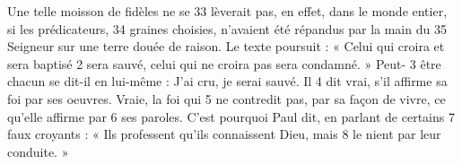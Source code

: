 Une telle moisson de fidèles ne se	 
33	 	lèverait pas, en effet, dans le monde entier, si les prédicateurs,	 
34	 	graines choisies, n'avaient été répandus par la main du	 
35	 	Seigneur sur une terre douée de raison.
Le texte poursuit : « Celui qui croira et sera baptisé	 
2	 	sera sauvé, celui qui ne croira pas sera condamné. » Peut-	 
3	 	être chacun se dit-il en lui-même : J'ai cru, je serai sauvé. Il	 
4	 	dit vrai, s'il affirme sa foi par ses oeuvres. Vraie, la foi qui	 
5	 	ne contredit pas, par sa façon de vivre, ce qu'elle affirme par	 
6	 	ses paroles. C'est pourquoi Paul dit, en parlant de certains	 
7	 	faux croyants : « Ils professent qu'ils connaissent Dieu, mais	 
8	 	le nient par leur conduite. »